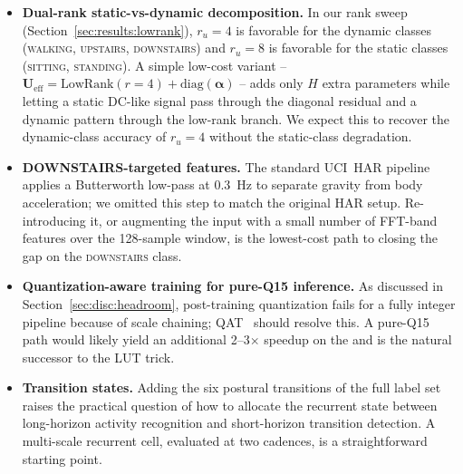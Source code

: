 \begin{itemize}
\item \textbf{Dual-rank static-vs-dynamic decomposition.} In our
rank sweep (Section~\ref{sec:results:lowrank}), $r_u{=}4$ is
favorable for the dynamic classes (\textsc{walking},
\textsc{upstairs}, \textsc{downstairs}) and $r_u{=}8$ is favorable
for the static classes (\textsc{sitting}, \textsc{standing}).
A simple low-cost variant -- $\mathbf{U}_\text{eff} = \mathrm{LowRank}(r{=}4) + \mathrm{diag}(\boldsymbol{\alpha})$
-- adds only $H$ extra parameters while letting a static
DC-like signal pass through the diagonal residual and a dynamic
pattern through the low-rank branch. We expect this to recover
the dynamic-class accuracy of $r_u{=}4$ without the static-class
degradation.

\item \textbf{DOWNSTAIRS-targeted features.} The standard
UCI~HAR pipeline applies a Butterworth low-pass at 0.3~Hz to
separate gravity from body acceleration; we omitted this step to
match the original \fastgrnn{} HAR setup. Re-introducing it, or
augmenting the input with a small number of FFT-band features over
the 128-sample window, is the lowest-cost path to closing the gap
on the \textsc{downstairs} class.

\item \textbf{Quantization-aware training for pure-Q15 inference.}
As discussed in Section~\ref{sec:disc:headroom}, post-training
quantization fails for a fully integer pipeline because of scale
chaining; QAT~\cite{hubara2017qnn} should resolve this. A pure-Q15
path would likely yield an additional 2--3$\times$ speedup on the
\msp{} and is the natural successor to the LUT trick.

\item \textbf{Transition states.} Adding the six postural transitions
of the full \hapt{} label set raises the practical question of
how to allocate the recurrent state between long-horizon
activity recognition and short-horizon transition detection.
A multi-scale recurrent cell, evaluated at two cadences, is a
straightforward starting point.
\end{itemize}
